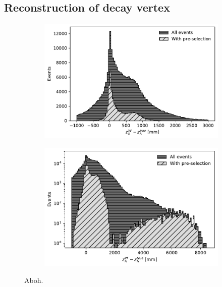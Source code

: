 \subsection{Reconstruction of \texorpdfstring{\lz}{Lambda} decay vertex}
\label{sec:lambda_endvertex_bias}
\begin{figure}[t]
	\centering
	\begin{subfigure}{.45\textwidth}
		\includegraphics[width=\textwidth]{graphics/04-event_selection/Lambda_endvertex_bias_z.pdf}
		\caption{}
	\end{subfigure}
	\begin{subfigure}{.45\textwidth}
		\includegraphics[width=\textwidth]{graphics/04-event_selection/Lambda_endvertex_bias_z_log.pdf}
		\caption{}
	\end{subfigure}
	\caption{Aboh.}
\end{figure}

